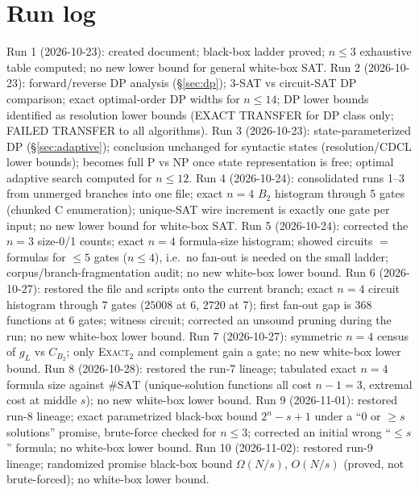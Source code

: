\documentclass[11pt]{article}
\begin{document}
\section*{Run log}
Run 1 (2026-10-23): created document; black-box ladder proved; $n\le3$ exhaustive table computed; no new lower bound for general white-box SAT.
Run 2 (2026-10-23): forward/reverse DP analysis (\S\ref{sec:dp}); 3-SAT vs circuit-SAT DP comparison; exact optimal-order DP widths for $n\le14$; DP lower bounds identified as resolution lower bounds (EXACT TRANSFER for DP class only; FAILED TRANSFER to all algorithms).
Run 3 (2026-10-23): state-parameterized DP (\S\ref{sec:adaptive}); conclusion unchanged for syntactic states (resolution/CDCL lower bounds); becomes full P vs NP once state representation is free; optimal adaptive search computed for $n\le12$.
Run 4 (2026-10-24): consolidated runs 1--3 from unmerged branches into one file; exact $n=4$ $B_2$ histogram through 5 gates (chunked C enumeration); unique-SAT wire increment is exactly one gate per input; no new lower bound for white-box SAT.
Run 5 (2026-10-24): corrected the $n=3$ size-0/1 counts; exact $n=4$ formula-size histogram; showed circuits $=$ formulas for $\le5$ gates ($n\le4$), i.e.\ no fan-out is needed on the small ladder; corpus/branch-fragmentation audit; no new white-box lower bound.
Run 6 (2026-10-27): restored the file and scripts onto the current branch; exact $n=4$ circuit histogram through 7 gates ($25008$ at 6, $2720$ at 7); first fan-out gap is $368$ functions at 6 gates; witness circuit; corrected an unsound pruning during the run; no new white-box lower bound.
Run 7 (2026-10-27): symmetric $n=4$ census of $g_L$ vs $C_{B_2}$; only \textsc{Exact}$_2$ and complement gain a gate; no new white-box lower bound.
Run 8 (2026-10-28): restored the run-7 lineage; tabulated exact $n=4$ formula size against $\#\mathrm{SAT}$ (unique-solution functions all cost $n-1=3$, extremal cost at middle $s$); no new white-box lower bound.
Run 9 (2026-11-01): restored run-8 lineage; exact parametrized black-box bound $2^n-s+1$ under a ``0 or $\ge s$ solutions'' promise, brute-force checked for $n\le3$; corrected an initial wrong ``$\le s$'' formula; no white-box lower bound.
Run 10 (2026-11-02): restored run-9 lineage; randomized promise black-box bound $\Omega(N/s)$, $O(N/s)$ (proved, not brute-forced); no white-box lower bound.
\end{document}
